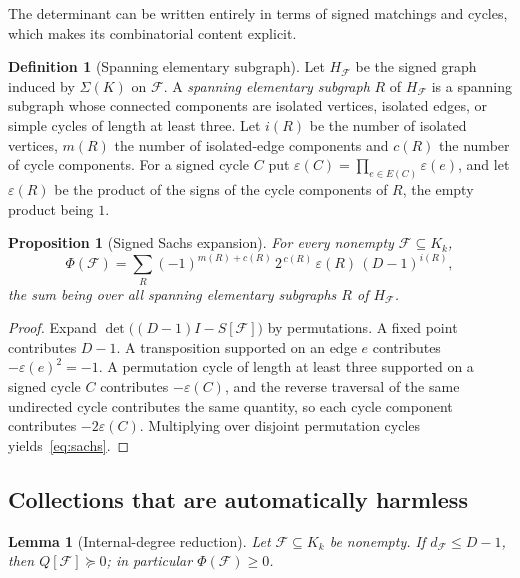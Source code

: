 \documentclass[11pt,reqno]{amsart}
\numberwithin{equation}{section}
\theoremstyle{plain}
\newtheorem{lemma}[theorem]{Lemma}
\newtheorem{proposition}[theorem]{Proposition}
\theoremstyle{definition}
\newtheorem{definition}[theorem]{Definition}
\newcommand{\eps}{\varepsilon}
\newcommand{\Fset}{\mathcal F}
\begin{document}
The determinant can be written entirely in terms of signed matchings and cycles, which makes its
combinatorial content explicit.
\begin{definition}[Spanning elementary subgraph]\label{def:sachs}
Let $H_{\Fset}$ be the signed graph induced by $\Sigma(K)$ on $\Fset$. A \emph{spanning
elementary subgraph} $R$ of $H_{\Fset}$ is a spanning subgraph whose connected components are
isolated vertices, isolated edges, or simple cycles of length at least three. Let $i(R)$ be the
number of isolated vertices, $m(R)$ the number of isolated-edge components and $c(R)$ the number
of cycle components. For a signed cycle $C$ put $\eps(C)=\prod_{e\in E(C)}\eps(e)$, and let
$\eps(R)$ be the product of the signs of the cycle components of $R$, the empty product being $1$.
\end{definition}

\begin{proposition}[Signed Sachs expansion]\label{prop:sachs}
For every nonempty $\Fset\subseteq K_k$,
\begin{equation}\label{eq:sachs}
  \Phi(\Fset)=\sum_{R}{(-1)}^{m(R)+c(R)}\,2^{\,c(R)}\,\eps(R)\,{(D-1)}^{i(R)},
\end{equation}
the sum being over all spanning elementary subgraphs $R$ of $H_{\Fset}$.
\end{proposition}

\begin{proof}
Expand $\det\bigl((D-1)I-S[\Fset]\bigr)$ by permutations. A fixed point contributes $D-1$. A
transposition supported on an edge $e$ contributes $-{\eps(e)}^{2}=-1$. A permutation cycle of length
at least three supported on a signed cycle $C$ contributes $-\eps(C)$, and the reverse traversal
of the same undirected cycle contributes the same quantity, so each cycle component contributes
$-2\eps(C)$. Multiplying over disjoint permutation cycles yields~\eqref{eq:sachs}.
\end{proof}



\subsection{Collections that are automatically harmless}

\begin{lemma}[Internal-degree reduction]\label{lem:gersh}
Let $\Fset\subseteq K_k$ be nonempty. If $d_{\Fset}\le D-1$, then $Q[\Fset]\succeq0$; in
particular $\Phi(\Fset)\ge0$.
\end{lemma}
\end{document}
